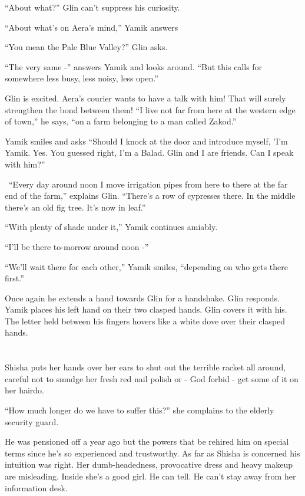 \documentclass[twoside,11pt]{book}
\begin{document}
``About what?'' Glin can't suppress his curiosity.

``About what's on Aera's mind,'' Yamik answers

``You mean the Pale Blue Valley?'' Glin asks.

``The very same -'' answers Yamik and looks around. ``But this calls for
somewhere less busy, less noisy, less open.''

Glin is excited. Aera's courier wants to have a talk with him! That will surely strengthen the bond between them!
``I live not far from here at the western edge of town,'' he says, ``on a farm
belonging to a man called Zakod.''

Yamik smiles and asks ``Should I knock at the door and introduce myself, 'I'm Yamik. Yes. You guessed
right, I'm a Balad. Glin and I are friends. Can I speak with him?''

\ ``Every day around noon I move irrigation pipes from here to there at the far end of the farm,'' explains
Glin. ``There's a row of cypresses there.  In the middle there's an old fig tree. It's now in leaf.''

``With plenty of shade under it,'' Yamik continues amiably.

``I'll be there to-morrow around noon -''

``We'll wait there for each other,'' Yamik smiles, ``depending on who gets there
first.''

Once again he extends a hand towards Glin for a handshake. Glin responds. Yamik places his left hand on their two
clasped hands. Glin covers it with his. The letter held between his fingers hovers like a white dove over their clasped
hands.


\bigskip

\chapter{}

Shisha puts her hands over her ears to shut out the terrible racket all around, careful not to smudge her fresh red
nail polish or - God forbid - get some of it on her hairdo.

``How much longer do we have to suffer this?'' she complains to the elderly security guard.

He was pensioned off a year ago but the powers that be rehired him on special terms since he's so experienced and
trustworthy. As far as Shisha is concerned his intuition was right. Her dumb-headedness, provocative dress and heavy
makeup are misleading. Inside she's a good girl. He can tell. He can't stay away from her information desk.
\end{document}

